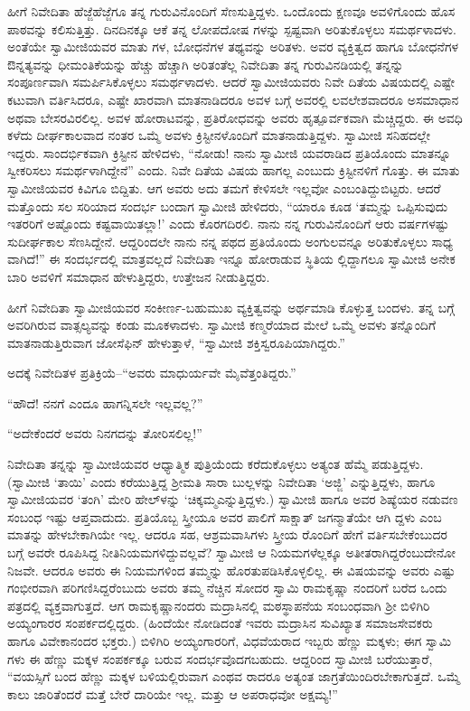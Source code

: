 ಹೀಗೆ ನಿವೇದಿತಾ ಹೆಜ್ಜೆಹೆಜ್ಜೆಗೂ ತನ್ನ ಗುರುವಿನೊಂದಿಗೆ ಸೆಣಸುತ್ತಿದ್ದಳು. ಒಂದೊಂದು ಕ್ಷಣವೂ ಅವಳಿಗೊಂದು ಹೊಸ ಪಾಠವನ್ನು ಕಲಿಸುತ್ತಿತ್ತು. ದಿನದಿನಕ್ಕೂ ಆಕೆ ತನ್ನ ಲೋಪದೋಷ ಗಳನ್ನು ಸ್ಪಷ್ಟವಾಗಿ ಅರಿತುಕೊಳ್ಳಲು ಸಮರ್ಥಳಾದಳು. ಅಂತೆಯೇ ಸ್ವಾಮೀಜಿಯವರ ಮಾತು ಗಳ, ಬೋಧನೆಗಳ ತಥ್ಯವನ್ನು ಅರಿತಳು. ಅವರ ವ್ಯಕ್ತಿತ್ವದ ಹಾಗೂ ಬೋಧನೆಗಳ ಔನ್ನತ್ಯವನ್ನು ಧೀಮಂತಿಕೆಯನ್ನು ಹೆಚ್ಚು ಹೆಚ್ಚಾಗಿ ಅರಿತಂತೆಲ್ಲ ನಿವೇದಿತಾ ತನ್ನ ಗುರುವಿನಡಿಯಲ್ಲಿ ತನ್ನನ್ನು ಸಂಪೂರ್ಣವಾಗಿ ಸಮರ್ಪಿಸಿಕೊಳ್ಳಲು ಸಮರ್ಥಳಾದಳು. ಆದರೆ ಸ್ವಾಮೀಜಿಯವರು ನಿವೇ ದಿತೆಯ ವಿಷಯದಲ್ಲಿ ಎಷ್ಟೇ ಕಟುವಾಗಿ ವರ್ತಿಸಿದರೂ, ಎಷ್ಟೇ ಖಾರವಾಗಿ ಮಾತನಾಡಿದರೂ ಅವಳ ಬಗ್ಗೆ ಅವರಲ್ಲಿ ಲವಲೇಶವಾದರೂ ಅಸಮಾಧಾನ ಅಥವಾ ಬೇಸರವಿರಲಿಲ್ಲ. ಅವಳ ಹೋರಾಟವನ್ನು, ಪ್ರತಿರೋಧವನ್ನು ಅವರು ಹೃತ್ಪೂರ್ವಕವಾಗಿ ಮೆಚ್ಚಿದ್ದರು. ಈ ಅವಧಿ ಕಳೆದು ದೀರ್ಘಕಾಲವಾದ ನಂತರ ಒಮ್ಮೆ ಅವಳು ಕ್ರಿಸ್ಟೀನಳೊಂದಿಗೆ ಮಾತನಾಡುತ್ತಿದ್ದಳು. ಸ್ವಾಮೀಜಿ ಸನಿಹದಲ್ಲೇ ಇದ್ದರು. ಸಾಂದರ್ಭಿಕವಾಗಿ ಕ್ರಿಸ್ಟೀನ ಹೇಳಿದಳು, “ನೋಡು! ನಾನು ಸ್ವಾಮೀಜಿ ಯವರಾಡಿದ ಪ್ರತಿಯೊಂದು ಮಾತನ್ನೂ ಸ್ವೀಕರಿಸಲು ಸಮರ್ಥಳಾಗಿದ್ದೇನೆ” ಎಂದು. ನಿವೇ ದಿತೆಯ ವಿಷಯ ಹಾಗಲ್ಲ ಎಂಬುದು ಕ್ರಿಸ್ಟೀನಳಿಗೆ ಗೊತ್ತು. ಈ ಮಾತು ಸ್ವಾಮೀಜಿಯವರ ಕಿವಿಗೂ ಬಿದ್ದಿತು. ಆಗ ಅವರು ಅದು ತಮಗೆ ಕೇಳಿಸಲೇ ಇಲ್ಲವೋ ಎಂಬಂತಿದ್ದುಬಿಟ್ಟರು. ಆದರೆ ಮತ್ತೊಂದು ಸಲ ಸರಿಯಾದ ಸಂದರ್ಭ ಬಂದಾಗ ಸ್ವಾಮೀಜಿ ಹೇಳಿದರು, “ಯಾರೂ ಕೂಡ ‘ತಮ್ಮನ್ನು ಒಪ್ಪಿಸುವುದು ಇತರರಿಗೆ ಅಷ್ಟೊಂದು ಕಷ್ಟವಾಯಿತಲ್ಲಾ!’ ಎಂದು ಕೊರಗದಿರಲಿ. ನಾನು ನನ್ನ ಗುರುವಿನೊಂದಿಗೆ ಆರು ವರ್ಷಗಳಷ್ಟು ಸುದೀರ್ಘಕಾಲ ಸೆಣಸಿದ್ದೇನೆ. ಆದ್ದರಿಂದಲೇ ನಾನು ನನ್ನ ಪಥದ ಪ್ರತಿಯೊಂದು ಅಂಗುಲವನ್ನೂ ಅರಿತುಕೊಳ್ಳಲು ಸಾಧ್ಯ ವಾಗಿದೆ!” ಈ ಸಂದರ್ಭದಲ್ಲಿ ಮಾತ್ರವಲ್ಲದೆ ನಿವೇದಿತಾ ಇನ್ನೂ ಹೋರಾಡುವ ಸ್ಥಿತಿಯ ಲ್ಲಿದ್ದಾಗಲೂ ಸ್ವಾಮೀಜಿ ಅನೇಕ ಬಾರಿ ಅವಳಿಗೆ ಸಮಾಧಾನ ಹೇಳುತ್ತಿದ್ದರು, ಉತ್ತೇಜನ ನೀಡುತ್ತಿದ್ದರು.

ಹೀಗೆ ನಿವೇದಿತಾ ಸ್ವಾಮೀಜಿಯವರ ಸಂಕೀರ್ಣ-ಬಹುಮುಖ ವ್ಯಕ್ತಿತ್ವವನ್ನು ಅರ್ಥಮಾಡಿ ಕೊಳ್ಳುತ್ತ ಬಂದಳು. ತನ್ನ ಬಗ್ಗೆ ಅವರಿಗಿರುವ ವಾತ್ಸಲ್ಯವನ್ನು ಕಂಡು ಮೂಕಳಾದಳು. ಸ್ವಾಮೀಜಿ ಕಣ್ಮರೆಯಾದ ಮೇಲೆ ಒಮ್ಮೆ ಅವಳು ತನ್ನೊಂದಿಗೆ ಮಾತನಾಡುತ್ತಿರುವಾಗ ಜೋಸೆಫಿನ್ ಹೇಳುತ್ತಾಳೆ, “ಸ್ವಾಮೀಜಿ ಶಕ್ತಿಸ್ವರೂಪಿಯಾಗಿದ್ದರು.”

ಅದಕ್ಕೆ ನಿವೇದಿತಳ ಪ್ರತಿಕ್ರಿಯೆ–“ಅವರು ಮಾಧುರ್ಯವೇ ಮೈವೆತ್ತಂತಿದ್ದರು.”

“ಹೌದೆ! ನನಗೆ ಎಂದೂ ಹಾಗನ್ನಿಸಲೇ ಇಲ್ಲವಲ್ಲ?”

“ಅದೇಕೆಂದರೆ ಅವರು ನಿನಗದನ್ನು ತೋರಿಸಲಿಲ್ಲ!”

ನಿವೇದಿತಾ ತನ್ನನ್ನು ಸ್ವಾಮೀಜಿಯವರ ಆಧ್ಯಾತ್ಮಿಕ ಪುತ್ರಿಯೆಂದು ಕರೆದುಕೊಳ್ಳಲು ಅತ್ಯಂತ ಹೆಮ್ಮೆ ಪಡುತ್ತಿದ್ದಳು. (ಸ್ವಾಮೀಜಿ ‘ತಾಯಿ’ ಎಂದು ಕರೆಯುತ್ತಿದ್ದ ಶ್ರೀಮತಿ ಸಾರಾ ಬುಲ್ಲಳನ್ನು ನಿವೇದಿತಾ ‘ಅಜ್ಜಿ’ ಎನ್ನುತ್ತಿದ್ದಳು, ಹಾಗೂ ಸ್ವಾಮೀಜಿಯವರ ‘ತಂಗಿ’ ಮೇರಿ ಹೇಲ್​ಳನ್ನು ‘ಚಿಕ್ಕಮ್ಮಎನ್ನುತ್ತಿದ್ದಳು.) ಸ್ವಾಮೀಜಿ ಹಾಗೂ ಅವರ ಶಿಷ್ಯೆಯರ ನಡುವಣ ಸಂಬಂಧ ಇಷ್ಟು ಆಪ್ತವಾದುದು. ಪ್ರತಿಯೊಬ್ಬ ಸ್ತ್ರೀಯೂ ಅವರ ಪಾಲಿಗೆ ಸಾಕ್ಷಾತ್ ಜಗನ್ಮಾತೆಯೇ ಆಗಿ ದ್ದಳು ಎಂಬ ಮಾತನ್ನು ಹೇಳಬೇಕಾಗಿಯೇ ಇಲ್ಲ. ಆದರೂ ಸಹ, ಆಶ್ರಮವಾಸಿಗಳು ಸ್ತ್ರೀಯ ರೊಂದಿಗೆ ಹೇಗೆ ವರ್ತಿಸಬೇಕೆಂಬುದರ ಬಗ್ಗೆ ಅವರೇ ರೂಪಿಸಿದ್ದ ನೀತಿನಿಯಮಗಳಿದ್ದುವಲ್ಲವೆ? ಸ್ವಾಮೀಜಿ ಆ ನಿಯಮಗಳೆಲ್ಲಕ್ಕೂ ಅತೀತರಾಗಿದ್ದರೆಂಬುದೇನೋ ನಿಜವೇ. ಆದರೂ ಅವರು ಈ ನಿಯಮಗಳಿಂದ ತಮ್ಮನ್ನು ಹೊರತುಪಡಿಸಿಕೊಳ್ಳಲಿಲ್ಲ. ಈ ವಿಷಯವನ್ನು ಅವರು ಎಷ್ಟು ಗಂಭೀರವಾಗಿ ಪರಿಗಣಿಸಿದ್ದರೆಂಬುದು ಅವರು ತಮ್ಮ ನೆಚ್ಚಿನ ಸೋದರ ಸ್ವಾಮಿ ರಾಮಕೃಷ್ಣಾ ನಂದರಿಗೆ ಬರೆದ ಒಂದು ಪತ್ರದಲ್ಲಿ ವ್ಯಕ್ತವಾಗುತ್ತದೆ. ಆಗ ರಾಮಕೃಷ್ಣಾನಂದರು ಮದ್ರಾಸಿನಲ್ಲಿ ಮಠಸ್ಥಾಪನೆಯ ಸಂಬಂಧವಾಗಿ ಶ್ರೀ ಬಿಳಿಗಿರಿ ಅಯ್ಯಂಗಾರರ ಸಂಪರ್ಕದಲ್ಲಿದ್ದರು. (ಹಿಂದೆಯೇ ನೋಡಿದಂತೆ ಇವರು ಮದ್ರಾಸಿನ ಸುವಿಖ್ಯಾತ ಸಮಾಜಸೇವಕರು ಹಾಗೂ ವಿವೇಕಾನಂದರ ಭಕ್ತರು.) ಬಿಳಿಗಿರಿ ಅಯ್ಯಂಗಾರರಿಗೆ, ವಿಧವೆಯರಾದ ಇಬ್ಬರು ಹೆಣ್ಣು ಮಕ್ಕಳು; ಈಗ ಸ್ವಾಮಿ ಗಳು ಈ ಹೆಣ್ಣು ಮಕ್ಕಳ ಸಂಪರ್ಕಕ್ಕೂ ಬರುವ ಸಂದರ್ಭವೊದಗಬಹುದು. ಆದ್ದರಿಂದ ಸ್ವಾಮೀಜಿ ಬರೆಯುತ್ತಾರೆ, “ವಯಸ್ಸಿಗೆ ಬಂದ ಹೆಣ್ಣು ಮಕ್ಕಳ ಬಳಿಯಲ್ಲಿರುವಾಗ ಎಂಥವ ರಾದರೂ ಅತ್ಯಂತ ಜಾಗ್ರತೆಯಿಂದಿರಬೇಕಾಗುತ್ತದೆ. ಒಮ್ಮೆ ಕಾಲು ಜಾರಿತೆಂದರೆ ಮತ್ತೆ ಬೇರೆ ದಾರಿಯೇ ಇಲ್ಲ. ಮತ್ತು ಆ ಅಪರಾಧವೋ ಅಕ್ಷಮ್ಯ!”

